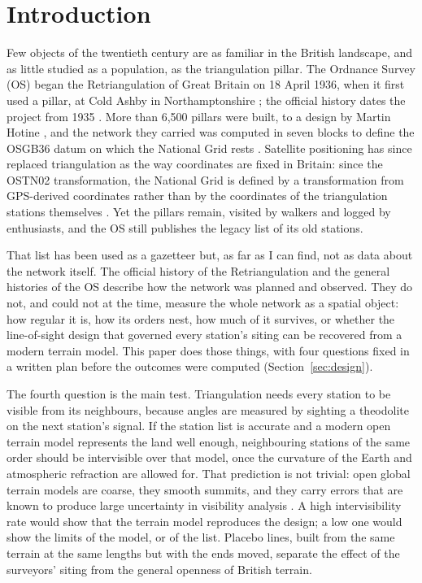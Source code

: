 \documentclass[11pt,a4paper]{article}
\begin{document}
\section{Introduction}\label{sec:intro}
Few objects of the twentieth century are as familiar in the British landscape, and as little studied as a population, as the triangulation pillar. The Ordnance Survey (OS) began the Retriangulation of Great Britain on 18 April 1936, when it first used a pillar, at Cold Ashby in Northamptonshire \citep{osblog2016}; the official history dates the project from 1935 \citep{os1967}. More than 6,500 pillars were built, to a design by Martin Hotine \citep{osblog2016}, and the network they carried was computed in seven blocks to define the OSGB36 datum on which the National Grid rests \citep{greaves2004,os1967}. Satellite positioning has since replaced triangulation as the way coordinates are fixed in Britain: since the OSTN02 transformation, the National Grid is defined by a transformation from GPS-derived coordinates rather than by the coordinates of the triangulation stations themselves \citep{greaves2004}. Yet the pillars remain, visited by walkers and logged by enthusiasts, and the OS still publishes the legacy list of its old stations.

That list has been used as a gazetteer but, as far as I can find, not as data about the network itself. The official history of the Retriangulation \citep{os1967} and the general histories of the OS \citep{seymour1980,owen1992} describe how the network was planned and observed. They do not, and could not at the time, measure the whole network as a spatial object: how regular it is, how its orders nest, how much of it survives, or whether the line-of-sight design that governed every station's siting can be recovered from a modern terrain model. This paper does those things, with four questions fixed in a written plan before the outcomes were computed (Section~\ref{sec:design}).

The fourth question is the main test. Triangulation needs every station to be visible from its neighbours, because angles are measured by sighting a theodolite on the next station's signal. If the station list is accurate and a modern open terrain model represents the land well enough, neighbouring stations of the same order should be intervisible over that model, once the curvature of the Earth and atmospheric refraction are allowed for. That prediction is not trivial: open global terrain models are coarse, they smooth summits, and they carry errors that are known to produce large uncertainty in visibility analysis \citep{fisher1991,fisher1993}. A high intervisibility rate would show that the terrain model reproduces the design; a low one would show the limits of the model, or of the list. Placebo lines, built from the same terrain at the same lengths but with the ends moved, separate the effect of the surveyors' siting from the general openness of British terrain.
\end{document}
